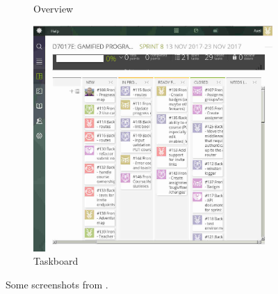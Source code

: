 \begin{figure}[hb]
\begin{subfigure}{.3\textwidth}
        \caption{Overview}
    \end{subfigure}
    \hfill
    \begin{subfigure}{.3\textwidth}
        \includegraphics[width=\textwidth]{img/taiga_taskboard.jpg}
        \caption{Taskboard}
    \end{subfigure}
    \caption{Some screenshots from \taiga{}.}
\end{figure}

